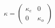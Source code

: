 \begin{equation}
\kappa =\left( 
\begin{array}{cc}
\kappa _{e} & 0 \\ 
0 & \kappa _{o}
\end{array}
\right) 
\end{equation}

